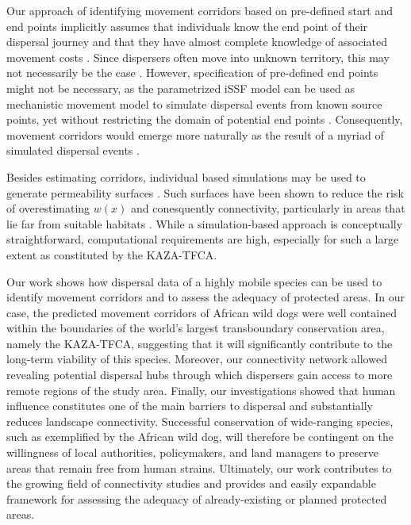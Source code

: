 \documentclass[abstract=on,10pt,a4paper,bibliography=totocnumbered]{article}
\begin{document}
Our approach of identifying movement corridors based on pre-defined start and
end points implicitly assumes that individuals know the end point of their
dispersal journey and that they have almost complete knowledge of associated
movement costs \citep{Panzacchi.2016}. Since dispersers often move into unknown
territory, this may not necessarily be the case \citep{Abrahms.2017,
Cozzi.2020}. However, specification of pre-defined end points might not be
necessary, as the parametrized iSSF model can be used as mechanistic movement
model to simulate dispersal events from known source points, yet without
restricting the domain of potential end points \citep{Signer.2017}.
Consequently, movement corridors would emerge more naturally as the result of a
myriad of simulated dispersal events \citep{Zeller.2020}.

Besides estimating corridors, individual based simulations may be used to
generate permeability surfaces \citep{Avgar.2016, Signer.2017}. Such surfaces
have been shown to reduce the risk of overestimating \(w(x)\) and conesquently
connectivity, particularly in areas that lie far from suitable habitats
\citep{Signer.2017}. While a simulation-based approach is conceptually
straightforward, computational requirements are high, especially for such a
large extent as constituted by the KAZA-TFCA.

Our work shows how dispersal data of a highly mobile species can be used to
identify movement corridors and to assess the adequacy of protected areas. In
our case, the predicted movement corridors of African wild dogs were well
contained within the boundaries of the world's largest transboundary
conservation area, namely the KAZA-TFCA, suggesting that it will significantly
contribute to the long-term viability of this species. Moreover, our
connectivity network allowed revealing potential dispersal hubs through which
dispersers gain access to more remote regions of the study area. Finally, our
investigations showed that human influence constitutes one of the main barriers
to dispersal and substantially reduces landscape connectivity. Successful
conservation of wide-ranging species, such as exemplified by the African wild
dog, will therefore be contingent on the willingness of local authorities,
policymakers, and land managers to preserve areas that remain free from human
strains. Ultimately, our work contributes to the growing field of connectivity
studies and provides and easily expandable framework for assessing the adequacy
of already-existing or planned protected areas.
\end{document}

